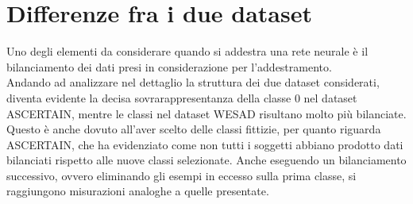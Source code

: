 \section{Differenze fra i due dataset}
Uno degli elementi da considerare quando si addestra una rete neurale è il bilanciamento dei dati presi in considerazione per l'addestramento.\\
Andando ad analizzare nel dettaglio la struttura dei due dataset considerati, diventa evidente la decisa sovrarappresentanza della classe 0 nel dataset ASCERTAIN, mentre le classi nel dataset WESAD risultano molto più bilanciate. Questo è anche dovuto all'aver scelto delle classi fittizie, per quanto riguarda ASCERTAIN, che ha evidenziato come non tutti i soggetti abbiano prodotto dati bilanciati rispetto alle nuove classi selezionate. Anche eseguendo un bilanciamento successivo, ovvero eliminando gli esempi in eccesso sulla prima classe, si raggiungono misurazioni analoghe a quelle presentate.

